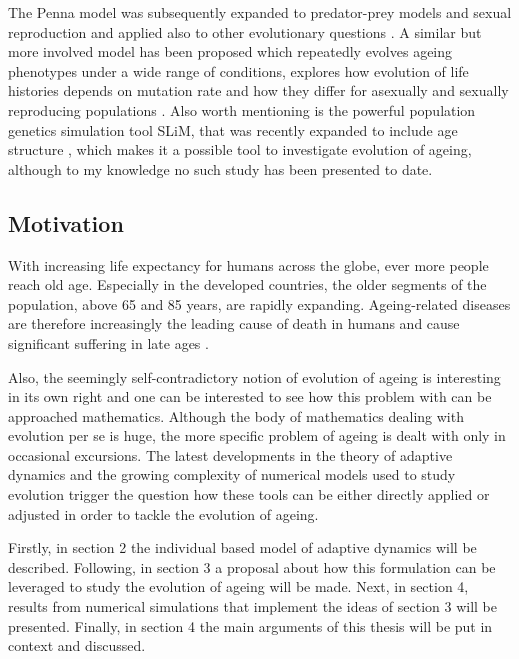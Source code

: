 \documentclass[11pt, a4paper]{article}
\theoremstyle{definition}
\begin{document}
    The Penna model was subsequently expanded to predator-prey models and sexual reproduction and applied also to other evolutionary questions \autocite{stauffer2007penna}. A similar but more involved model has been proposed which repeatedly evolves ageing phenotypes under a wide range of conditions, explores how evolution of life histories depends on mutation rate and how they differ for asexually and sexually reproducing populations \autocite{aegis2019}. 
    Also worth mentioning is the powerful population genetics simulation tool SLiM, that was recently expanded to include age structure \autocite{haller2019slim}, which makes it a possible tool to investigate evolution of ageing, although to my knowledge no such study has been presented to date.

\subsection{Motivation}
    With increasing life expectancy for humans across the globe, ever more people reach old age. Especially in the developed countries, the older segments of the population, above 65 and 85 years, are rapidly expanding. Ageing-related diseases are therefore increasingly the leading cause of death in humans and cause significant suffering in late ages \autocite{christensen2009}.
%

        Also, the seemingly self-contradictory notion of evolution of ageing is interesting in its own right and one can be interested to see how this problem with can be approached mathematics. Although the body of mathematics dealing with evolution per se is huge, the more specific problem of ageing is dealt with only in occasional excursions. The latest developments in the theory of adaptive dynamics and the growing complexity of numerical models used to study evolution trigger the question how these tools can be either directly applied or adjusted in order to tackle the evolution of ageing.

    Firstly, in section 2 the individual based model of adaptive dynamics will be described. Following, in section 3 a proposal about how this formulation can be leveraged to study the evolution of ageing will be made. Next, in section 4, results from numerical simulations that implement the ideas of section 3 will be presented. Finally, in section 4 the main arguments of this thesis will be put in context and discussed.
\end{document}
